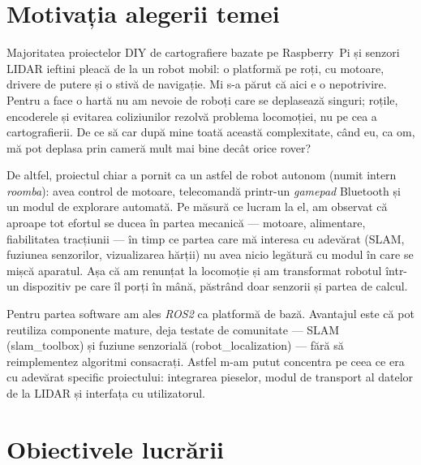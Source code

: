 \documentclass[a4paper,12pt,twoside,openany]{report}
\begin{document}
\section{Motivația alegerii temei}
\label{sec:motivatia}


Majoritatea proiectelor DIY de cartografiere bazate pe Raspberry~Pi și
senzori LIDAR ieftini pleacă de la un robot mobil: o platformă pe roți, cu
motoare, drivere de putere și o stivă de navigație. Mi s-a părut că aici e o
nepotrivire. Pentru a face o hartă nu am nevoie de roboți care se deplasează
singuri; roțile, encoderele și evitarea coliziunilor rezolvă problema
locomoției, nu pe cea a cartografierii. De ce să car după mine toată această
complexitate, când eu, ca om, mă pot deplasa prin cameră mult mai bine decât
orice rover?

De altfel, proiectul chiar a pornit ca un astfel de robot autonom (numit
intern \textit{roomba}): avea control de motoare, telecomandă printr-un
\textit{gamepad} Bluetooth și un modul de explorare automată. Pe măsură ce
lucram la el, am observat că aproape tot efortul se ducea în partea mecanică
— motoare, alimentare, fiabilitatea tracțiunii — în timp ce partea care mă
interesa cu adevărat (SLAM, fuziunea senzorilor, vizualizarea hărții) nu avea
nicio legătură cu modul în care se mișcă aparatul. Așa că am renunțat la
locomoție și am transformat robotul într-un dispozitiv pe care îl porți în
mână, păstrând doar senzorii și partea de calcul.

Pentru partea software am ales \textit{ROS2} ca platformă de bază. Avantajul
este că pot reutiliza componente mature, deja testate de comunitate — SLAM
(slam\_toolbox) și fuziune senzorială (robot\_localization) — fără să
reimplementez algoritmi consacrați. Astfel m-am putut concentra pe ceea ce
era cu adevărat specific proiectului: integrarea pieselor, modul de transport
al datelor de la LIDAR și interfața cu utilizatorul.

\section{Obiectivele lucrării}
\label{sec:obiective}
\end{document}
